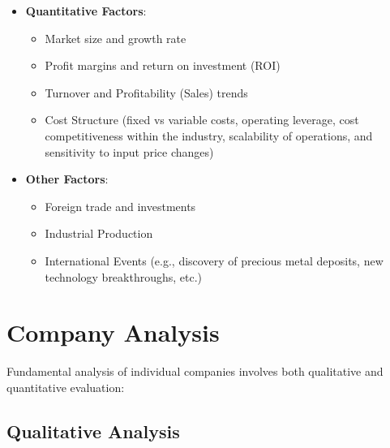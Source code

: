 \documentclass[12pt]{article}
\begin{document}
\begin{itemize}
\item \textbf{Quantitative Factors}:
    \begin{itemize}
    \item Market size and growth rate
    \item Profit margins and return on investment (ROI)
    \item Turnover and Profitability (Sales) trends
    \item Cost Structure (fixed vs variable costs, operating leverage, cost competitiveness within the industry, scalability of operations, and sensitivity to input price changes)
    \end{itemize}

\item \textbf{Other Factors}:
    \begin{itemize}
        \item Foreign trade and investments
        \item Industrial Production
        \item International Events (e.g., discovery of precious metal deposits, new technology breakthroughs, etc.)
    \end{itemize}
\end{itemize}

\section{Company Analysis}
Fundamental analysis of individual companies involves both qualitative and quantitative evaluation:

\subsection{Qualitative Analysis}
\end{document}
